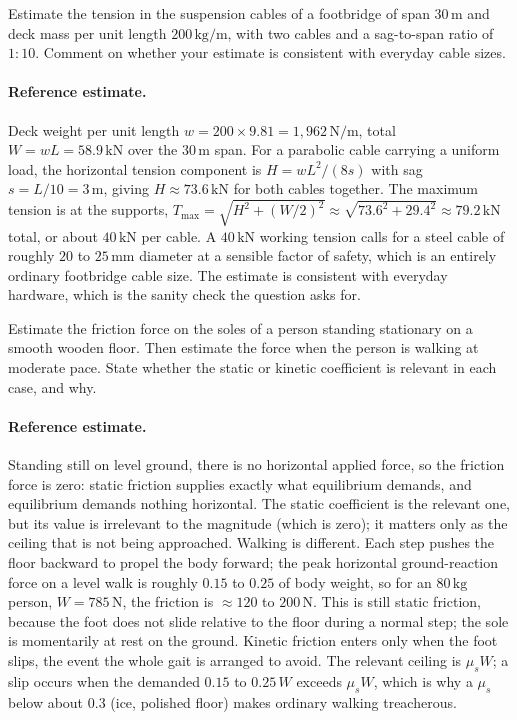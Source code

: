 \begin{exercise}
Estimate the tension in the suspension cables of a footbridge of
span $30\,\si{\meter}$ and deck mass per unit length
$200\,\si{\kilogram\per\meter}$, with two cables and a sag-to-span
ratio of $1{:}10$. Comment on whether your estimate is consistent
with everyday cable sizes.
\paragraph{Reference estimate.} Deck weight per unit length $w = 200
\times 9.81 = 1{,}962\,\text{N/m}$, total $W = wL = 58.9\,\text{kN}$
over the $30\,\si{\meter}$ span. For a parabolic cable carrying a uniform
load, the horizontal tension component is $H = wL^2/(8s)$ with sag $s =
L/10 = 3\,\si{\meter}$, giving $H \approx 73.6\,\text{kN}$ for both
cables together. The maximum tension is at the supports, $T_{\max} =
\sqrt{H^2 + (W/2)^2} \approx \sqrt{73.6^2 + 29.4^2} \approx
79.2\,\text{kN}$ total, or about $40\,\text{kN}$ per cable. A
$40\,\text{kN}$ working tension calls for a steel cable of roughly $20$
to $25\,\si{\milli\meter}$ diameter at a sensible factor of safety,
which is an entirely ordinary footbridge cable size. The estimate is
consistent with everyday hardware, which is the sanity check the question
asks for.
\end{exercise}

\begin{exercise}
Estimate the friction force on the soles of a person standing
stationary on a smooth wooden floor. Then estimate the force when
the person is walking at moderate pace. State whether the static
or kinetic coefficient is relevant in each case, and why.
\paragraph{Reference estimate.} Standing still on level ground, there is
no horizontal applied force, so the friction force is zero: static
friction supplies exactly what equilibrium demands, and equilibrium
demands nothing horizontal. The static coefficient is the relevant one,
but its value is irrelevant to the magnitude (which is zero); it matters
only as the ceiling that is not being approached. Walking is different.
Each step pushes the floor backward to propel the body forward; the peak
horizontal ground-reaction force on a level walk is roughly $0.15$ to
$0.25$ of body weight, so for an $80\,\si{\kilogram}$ person, $W = 785\,
\text{N}$, the friction is $\approx 120$ to $200\,\text{N}$. This is
still static friction, because the foot does not slide relative to the
floor during a normal step; the sole is momentarily at rest on the
ground. Kinetic friction enters only when the foot slips, the event the
whole gait is arranged to avoid. The relevant ceiling is $\mu_s W$; a
slip occurs when the demanded $0.15$ to $0.25\,W$ exceeds $\mu_s W$,
which is why a $\mu_s$ below about $0.3$ (ice, polished floor) makes
ordinary walking treacherous.
\end{exercise}

